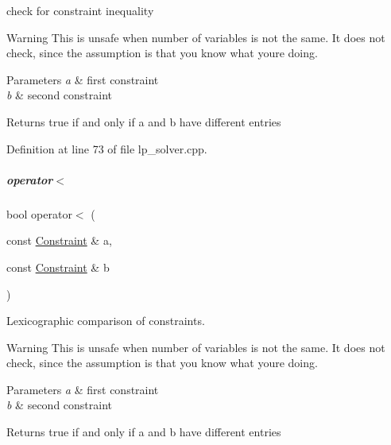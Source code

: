 check for constraint inequality 

\begin{DoxyWarning}{Warning}
This is unsafe when number of variables is not the same. It does not check, since the assumption is that you know what you\textquotesingle{}re doing. 
\end{DoxyWarning}

\begin{DoxyParams}{Parameters}
{\em a} & first constraint \\
\hline
{\em b} & second constraint \\
\hline
\end{DoxyParams}
\begin{DoxyReturn}{Returns}
{\ttfamily true} if and only if {\ttfamily a} and {\ttfamily b} have different entries 
\end{DoxyReturn}


Definition at line 73 of file lp\+\_\+solver.\+cpp.

\mbox{\label{group___c_l_s_solvers_ad7246226080bd15a0d477cd905b4b71c}} 
\subparagraph{\texorpdfstring{operator$<$}{operator<}}
{\footnotesize\ttfamily bool operator$<$ (\begin{DoxyParamCaption}\item[{const \hyperlink{group___c_l_s_solvers_class_l_p___solvers_1_1_constraint}{Constraint} \&}]{a,  }\item[{const \hyperlink{group___c_l_s_solvers_class_l_p___solvers_1_1_constraint}{Constraint} \&}]{b }\end{DoxyParamCaption})\hspace{0.3cm}{\ttfamily [friend]}}



Lexicographic comparison of constraints. 

\begin{DoxyWarning}{Warning}
This is unsafe when number of variables is not the same. It does not check, since the assumption is that you know what you\textquotesingle{}re doing. 
\end{DoxyWarning}

\begin{DoxyParams}{Parameters}
{\em a} & first constraint \\
\hline
{\em b} & second constraint \\
\hline
\end{DoxyParams}
\begin{DoxyReturn}{Returns}
{\ttfamily true} if and only if {\ttfamily a} and {\ttfamily b} have different entries 
\end{DoxyReturn}


